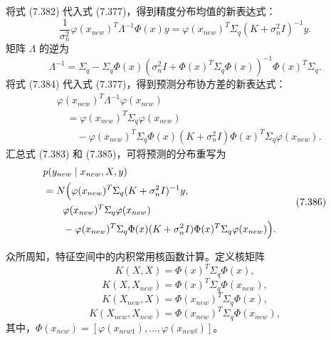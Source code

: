 将式 (7.382) 代入式 (7.377)，得到精度分布均值的新表达式：
\begin{equation}
\frac1{\sigma_n^2}\varphi(x_{new})^T\Lambda^{-1}\Phi(x)y
=\varphi(x_{new})^T\Sigma_q(K+\sigma_n^2I)^{-1}y.
\tag{7.383}
\end{equation}
矩阵 $\Lambda$ 的逆为
\begin{equation}
\Lambda^{-1}=\Sigma_q-\Sigma_q\Phi(x)\left(\sigma_n^2I+\Phi(x)^T\Sigma_q\Phi(x)\right)^{-1}\Phi(x)^T\Sigma_q.
\tag{7.384}
\end{equation}
将式 (7.384) 代入式 (7.377)，得到预测分布协方差的新表达式：
\begin{equation}
\begin{aligned}
&\varphi(x_{new})^T\Lambda^{-1}\varphi(x_{new})\\
&\quad=\varphi(x_{new})^T\Sigma_q\varphi(x_{new})\\
&\qquad-\varphi(x_{new})^T\Sigma_q\Phi(x)(K+\sigma_n^2I)\Phi(x)^T\Sigma_q\varphi(x_{new}).
\end{aligned}
\tag{7.385}
\end{equation}
汇总式 (7.383) 和 (7.385)，可将预测的分布重写为
\begin{equation}
\begin{aligned}
&p(y_{new}\mid x_{new},X,y)\\
&=N\Bigl(\varphi(x_{new})^T\Sigma_q(K+\sigma_n^2I)^{-1}y,\\
&\qquad\varphi(x_{new})^T\Sigma_q\varphi(x_{new})\\
&\qquad-\varphi(x_{new})^T\Sigma_q\Phi(x)(K+\sigma_n^2I)\Phi(x)^T\Sigma_q\varphi(x_{new})\Bigr).
\end{aligned}
\tag{7.386}
\end{equation}

众所周知，特征空间中的内积常用核函数计算。定义核矩阵
\begin{equation}
K(X,X)=\Phi(x)^T\Sigma_q\Phi(x),
\tag{7.387}
\end{equation}
\begin{equation}
K(X,X_{new})=\Phi(x)^T\Sigma_q\Phi(x_{new}),
\tag{7.388}
\end{equation}
\begin{equation}
K(X_{new},X)=\Phi(x_{new})^T\Sigma_q\Phi(x),
\tag{7.389}
\end{equation}
\begin{equation}
K(X_{new},X_{new})=\Phi(x_{new})^T\Sigma_q\Phi(x_{new}),
\tag{7.390}
\end{equation}
其中，$\Phi(x_{new})=[\varphi(x_{new1}),\ldots,\varphi(x_{newl})]$。

